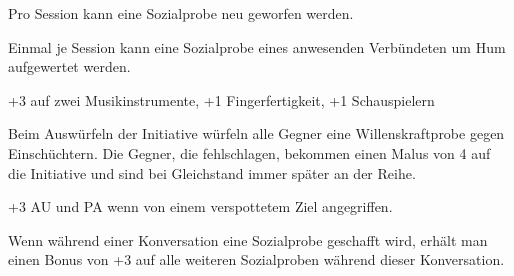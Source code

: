 \documentclass[../../Heldenanleitung2]{subfiles}
\begin{document}
\begin{multicols}{2}

\begin{tcolorbox}[title={Gelassenheit}, colbacktitle=yellow, coltitle=black]    
   Pro Session kann eine Sozialprobe neu geworfen werden.
\end{tcolorbox}

\begin{tcolorbox}[title={Überspielen}, colbacktitle=yellow, coltitle=black]    
   Einmal je Session kann eine Sozialprobe eines anwesenden Verbündeten um Hum aufgewertet werden.
\end{tcolorbox}

\begin{tcolorbox}[title={Gauklertum}, colbacktitle=yellow, coltitle=black]    
   +3 auf zwei Musikinstrumente, +1 Fingerfertigkeit, +1 Schauspielern
\end{tcolorbox}



\begin{tcolorbox}[title={Beeindruckende Gestalt}, colbacktitle=yellow, coltitle=black]    
   Beim Auswürfeln der Initiative würfeln alle Gegner eine Willenskraftprobe gegen Einschüchtern. Die Gegner, die fehlschlagen, bekommen einen Malus von 4 auf die Initiative und sind bei Gleichstand immer später an der Reihe.
\end{tcolorbox}

\begin{tcolorbox}[title={Provokator}, colbacktitle=yellow, coltitle=black]	
   +3 AU und PA wenn von einem verspottetem Ziel angegriffen.
\end{tcolorbox}

\begin{tcolorbox}[title={Konversationist}, colbacktitle=yellow, coltitle=black]    
   Wenn während einer Konversation eine Sozialprobe geschafft wird, erhält man einen Bonus von +3 auf alle weiteren Sozialproben während dieser Konversation.
\end{tcolorbox}


\end{multicols}
\end{document}
